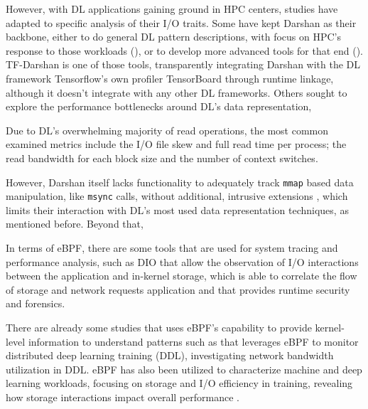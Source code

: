 \documentclass[conference]{IEEEtran}
\begin{document}
However, with DL applications gaining ground in HPC centers, studies have adapted to specific analysis of their I/O traits. Some have kept Darshan as their backbone, either to do general DL pattern descriptions, with focus on HPC's response to those workloads (\cite{IOHPCDLBOOK,CharacterizationMLIOLeadHPC, UnderstandingDLIOHPC}), or to develop more advanced tools for that end (\cite{DFTracerAIHPC}). TF-Darshan \cite{tfdarshan} is one of those tools, transparently integrating Darshan with the DL framework Tensorflow's own profiler TensorBoard through runtime linkage, although it doesn't integrate with any other DL frameworks. Others sought to explore the performance bottlenecks around DL's data representation, 

Due to DL's overwhelming majority of read operations, the most common examined metrics include the I/O file skew and full read time per process; the read bandwidth for each block size and the number of context switches.

However, Darshan itself lacks functionality to adequately track \texttt{mmap} based data manipulation, like \texttt{msync} calls, without additional, intrusive extensions \cite{tfdarshan}, which limits their interaction with DL's most used data representation techniques, as mentioned before. Beyond that, 

In terms of eBPF, there are some tools that are used for system tracing and performance analysis,
such as DIO \cite{DIO} that allow the observation of I/O interactions between the application and in-kernel storage,
\cite{CAT} which is able to correlate the flow of storage and network requests application and \cite{tracee} that provides runtime security and forensics.  

There are already some studies that uses eBPF's capability to provide kernel-level information to understand patterns such as \cite{eBPFDLNetwork} that
leverages eBPF to monitor distributed deep learning training (DDL), investigating network bandwidth utilization in DDL.
eBPF has also been utilized to characterize machine and deep learning workloads, focusing on storage and I/O efficiency in training,
revealing how storage interactions impact overall performance \cite{OanaDL, OanaML}.
\end{document}
